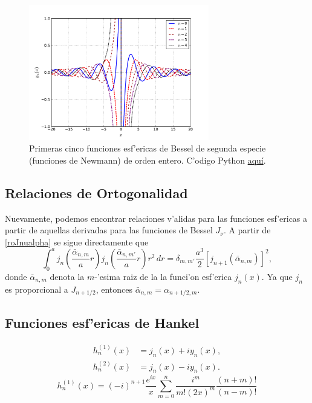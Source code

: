 %
\begin{figure}[H]
\centering
\includegraphics[angle=0,width=0.7\textwidth]{figs/fig-Bessel-Esferica-y.pdf}
\caption{Primeras cinco funciones esf'ericas de Bessel de segunda especie (funciones de Newmann) de orden entero. C'odigo Python \href{https://github.com/gfrubi/FM2/blob/master/figuras-editables/fig-Bessel.py}{aqu\'i}.}
\label{fig-nn}
\end{figure}


\subsection{Relaciones de Ortogonalidad}
Nuevamente, podemos encontrar relaciones v'alidas para las funciones esf'ericas a partir de aquellas derivadas para las funciones de Bessel $J_\nu$. A partir de \eqref{roJnualpha} se sigue directamente que
\begin{equation}\label{rojnualpha}
\boxed{\int_0^a j_n\left(\frac{\bar{\alpha}_{n,m}}{a}r\right)j_n\left(\frac{\bar{\alpha}_{n,m'}}{a}r\right)r^2\,dr
=\delta_{m,m'}\frac{a^3}{2}\left[j_{n+1}(\bar{\alpha}_{n,m})\right]^2,}
\end{equation}
donde $\bar{\alpha}_{n,m}$ denota la $m$-'esima raiz de la la funci'on esf'erica $j_n(x)$. Ya que $j_n$ es proporcional a $J_{n+1/2}$, entonces $\bar{\alpha}_{n,m}=\alpha_{n+1/2,m}$.


\subsection{Funciones esf'ericas de Hankel} 
\begin{align}
h_n^{(1)}(x) &= j_n(x) + i y_n(x) , \\
h_n^{(2)}(x) &= j_n(x) - i y_n(x).
\end{align}
\begin{equation}
h_n^{(1)}(x) = (-i)^{n+1} \frac{e^{ix}}{x} \sum_{m=0}^n \frac{i^m}{m!(2x)^m} \frac{(n+m)!}{(n-m)!}
\end{equation}

